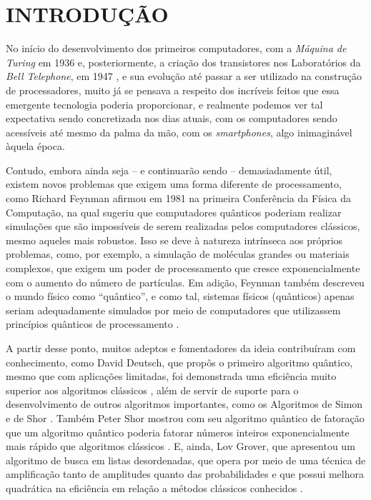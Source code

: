\chapter{INTRODUÇ\~{A}O}
\label{chap:introducao}

No início do desenvolvimento dos primeiros computadores, com a \emph{M\'{a}quina de Turing} em 1936 e, posteriormente, a criaç\~{a}o dos transistores nos Laboratórios da \emph{Bell Telephone}, em 1947 \cite{transistor_hist}, e sua evoluç\~{a}o at\'{e} passar a ser utilizado na construç\~{a}o de processadores, muito j\'{a} se pensava a respeito dos incríveis feitos que essa emergente tecnologia poderia proporcionar, e realmente podemos ver tal expectativa sendo concretizada nos dias atuais, com os computadores sendo acessíveis at\'{e} mesmo da palma da m\~{a}o, com os \textit{smartphones}, algo inimagin\'{a}vel àquela \'{e}poca.

Contudo, embora ainda seja – e continuar\~{a}o sendo – demasiadamente útil, existem novos problemas que exigem uma forma diferente de processamento, como Richard Feynman afirmou em 1981 na primeira Confer\^{e}ncia da Física da Computaç\~{a}o, na qual sugeriu que computadores qu\^{a}nticos poderiam realizar simulações que s\~{a}o impossíveis de serem realizadas pelos computadores cl\'{a}ssicos, mesmo aqueles mais robustos. Isso se deve à natureza intrínseca aos próprios problemas, como, por exemplo, a simulaç\~{a}o de mol\'{e}culas grandes ou materiais complexos, que exigem um poder de processamento que cresce exponencialmente com o aumento do número de partículas. Em adiç\~{a}o, Feynman tamb\'{e}m descreveu o mundo físico como “qu\^{a}ntico”, e como tal, sistemas físicos (qu\^{a}nticos) apenas seriam adequadamente simulados por meio de computadores que utilizassem princípios qu\^{a}nticos de processamento \cite{feynman1982}.

A partir desse ponto, muitos adeptos e fomentadores da ideia contribuíram com conhecimento, como David Deutsch, que propôs o primeiro algoritmo qu\^{a}ntico, mesmo que com aplicações limitadas, foi demonstrada uma efici\^{e}ncia muito superior aos algoritmos cl\'{a}ssicos \cite{deutsch1985}, al\'{e}m de servir de suporte para o desenvolvimento de outros algoritmos importantes, como os Algoritmos de Simon \cite{simon1994} e de Shor . Tamb\'{e}m Peter Shor mostrou com seu algoritmo qu\^{a}ntico de fatoraç\~{a}o que um algoritmo qu\^{a}ntico poderia fatorar números inteiros exponencialmente mais r\'{a}pido que algoritmos cl\'{a}ssicos \cite{shor1994}. E, ainda, Lov Grover, que apresentou um algoritmo de busca em listas desordenadas, que opera por meio de uma t\'{e}cnica de amplificaç\~{a}o tanto de amplitudes quanto das probabilidades e que possui melhora quadr\'{a}tica na efici\^{e}ncia em relaç\~{a}o a m\'{e}todos cl\'{a}ssicos conhecidos \cite{grover1996}. 

